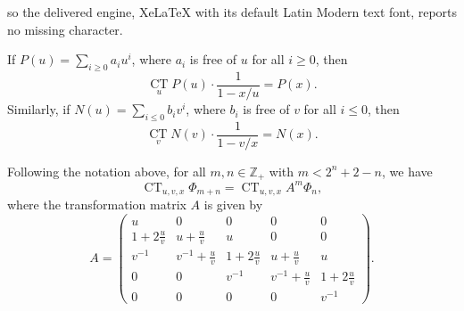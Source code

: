 \documentclass[10pt,a4paper]{amsart}
\def\CT{\mathop{\mathrm{CT}}}
\begin{document}
so the delivered engine, XeLaTeX with its default Latin Modern text font, reports no missing character.
\begin{lem}\label{P-x,u}
If $P(u)=\sum_{i\geq0}a_{i}u^{i}$, where $a_{i}$ is free of $u$ for all $i\geq0$, then
$$\CT\limits_{u}P(u)\cdot\frac{1}{1-x/u}=P(x).$$
Similarly, if $N(u)=\sum_{i\leq0}b_{i}v^{i}$, where $b_{i}$ is free of $v$ for all $i\leq0$, then
$$\CT\limits_{v}N(v)\cdot\frac{1}{1-v/x}=N(x).$$
\end{lem}

\begin{prop}\label{Recurrence-Matrix-uv}
Following the notation above, for all $m, n \in \mathbb{Z}_{+}$ with $m < 2^{n} + 2 - n$, we have
\[
\CT_{u,v,x} \Phi_{m+n} = \CT_{u,v,x} A^{m} \Phi_{n},
\]
where the transformation matrix $A$ is given by
\[
A = \begin{pmatrix}
u & 0 & 0 & 0 & 0 \\
1 + 2\frac{u}{v} & u + \frac{u}{v} & u & 0 & 0 \\
v^{-1} & v^{-1} + \frac{u}{v} & 1 + 2\frac{u}{v} & u + \frac{u}{v} & u \\
0 & 0 & v^{-1} & v^{-1} + \frac{u}{v} & 1 + 2\frac{u}{v} \\
0 & 0 & 0 & 0 & v^{-1}
\end{pmatrix}.
\]
\end{prop}
\end{document}
